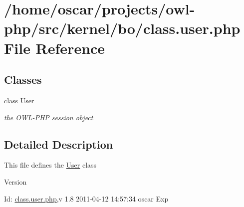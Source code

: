 \section{/home/oscar/projects/owl-\/php/src/kernel/bo/class.user.php File Reference}
\label{class_8user_8php}
\subsection*{Classes}
\begin{DoxyCompactItemize}
\item 
class \hyperlink{classUser}{User}
\begin{DoxyCompactList}\small\item\em the OWL-\/PHP session object \item\end{DoxyCompactList}\end{DoxyCompactItemize}


\subsection{Detailed Description}
This file defines the \hyperlink{classUser}{User} class \begin{DoxyVersion}{Version}

\end{DoxyVersion}
\begin{DoxyParagraph}{Id:}
\hyperlink{class_8user_8php}{class.user.php},v 1.8 2011-\/04-\/12 14:57:34 oscar Exp 
\end{DoxyParagraph}
